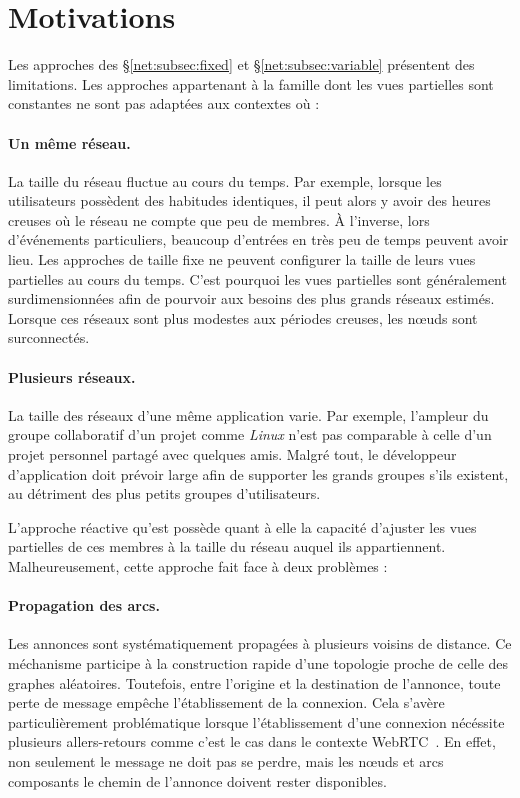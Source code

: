 
\section{Motivations}
\label{net:sec:motivations}

Les approches des §\ref{net:subsec:fixed} et §\ref{net:subsec:variable} présentent des
limitations. Les approches appartenant à la famille dont les vues partielles
sont constantes ne sont pas adaptées aux contextes où :

\paragraph{Un même réseau.} La taille du réseau fluctue au cours du temps. Par
exemple, lorsque les utilisateurs possèdent des habitudes identiques, il peut
alors y avoir des heures creuses où le réseau ne compte que peu de membres. À
l'inverse, lors d'événements particuliers, beaucoup d'entrées en très peu de
temps peuvent avoir lieu.  Les approches de taille fixe ne peuvent configurer la
taille de leurs vues partielles au cours du temps. C'est pourquoi les vues
partielles sont généralement surdimensionnées afin de pourvoir aux besoins des
plus grands réseaux estimés. Lorsque ces réseaux sont plus modestes aux périodes
creuses, les nœuds sont surconnectés.

\paragraph{Plusieurs réseaux.} La taille des réseaux d'une même application
varie. Par exemple, l'ampleur du groupe collaboratif d'un projet comme
\emph{Linux} n'est pas comparable à celle d'un projet personnel partagé avec
quelques amis. Malgré tout, le développeur d'application doit prévoir large afin
de supporter les grands groupes s'ils existent, au détriment des plus petits
groupes d'utilisateurs.



L'approche réactive qu'est \SCAMP possède quant à elle la capacité d'ajuster les
vues partielles de ces membres à la taille du réseau auquel ils
appartiennent. Malheureusement, cette approche fait face à deux problèmes :

\paragraph{Propagation des arcs.} Les annonces sont systématiquement propagées à
plusieurs voisins de distance. Ce méchanisme participe à la construction rapide
d'une topologie proche de celle des graphes aléatoires. Toutefois, entre
l'origine et la destination de l'annonce, toute perte de message empêche
l'établissement de la connexion. Cela s'avère particulièrement problématique
lorsque l'établissement d'une connexion nécéssite plusieurs allers-retours comme
c'est le cas dans le contexte WebRTC~\cite{webrtc}. En effet, non seulement le
message ne doit pas se perdre, mais les nœuds et arcs composants le chemin de
l'annonce doivent rester disponibles.

